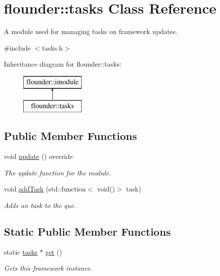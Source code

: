 \hypertarget{classflounder_1_1tasks}{}\section{flounder\+:\+:tasks Class Reference}
\label{classflounder_1_1tasks}


A module used for managing tasks on framework updates.  




{\ttfamily \#include $<$tasks.\+h$>$}

Inheritance diagram for flounder\+:\+:tasks\+:\begin{figure}[H]
\begin{center}
\leavevmode
\includegraphics[height=2.000000cm]{classflounder_1_1tasks}
\end{center}
\end{figure}
\subsection*{Public Member Functions}
\begin{DoxyCompactItemize}
\item 
void \hyperlink{classflounder_1_1tasks_a32e51c65b63e8c98097d5d40c1912e5c}{update} () override
\begin{DoxyCompactList}\small\item\em The update function for the module. \end{DoxyCompactList}\item 
void \hyperlink{classflounder_1_1tasks_a4c162853b207b90c2686ce0eb9dc9265}{add\+Task} (std\+::function$<$ void()$>$ task)
\begin{DoxyCompactList}\small\item\em Adds an task to the que. \end{DoxyCompactList}\end{DoxyCompactItemize}
\subsection*{Static Public Member Functions}
\begin{DoxyCompactItemize}
\item 
static \hyperlink{classflounder_1_1tasks}{tasks} $\ast$ \hyperlink{classflounder_1_1tasks_a24877315f9d4a52671f5d62ea40d83ec}{get} ()
\begin{DoxyCompactList}\small\item\em Gets this framework instance. \end{DoxyCompactList}\end{DoxyCompactItemize}
